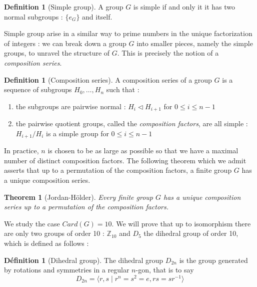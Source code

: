 \documentclass{article}
\theoremstyle{definition}
\newtheorem{definition}[subsubsection]{Définition}
\theoremstyle{plain}
\theoremstyle{plain}
\theoremstyle{plain}
\theoremstyle{plain}
\theoremstyle{definition}
\newtheorem{defeng}[subsubsection]{Definition}
\theoremstyle{plain}
\newtheorem{thmeng}[subsubsection]{Theorem}
\theoremstyle{plain}
\begin{document}
\begin{defeng}[Simple group]
	A group \( G \) is simple if and only it it has two normal subgroups : 
	\( \{e_G\} \) and itself.
\end{defeng}

\par Simple group arise in a similar way to prime numbers in the unique factorization of integers : we can break down a group \( G \) into smaller pieces, namely the simple groups, to unravel the structure of \( G \).
This is precisely the notion of a \textit{composition series}.

\begin{defeng}[Composition series]
	A composition series of a group \( G \) is a sequence of subgroups \( H_0, \ldots, H_n \) such that :
	\begin{enumerate}[label = (\roman*)]
	\item the subgroups are pairwise normal : 
		\( H_i \triangleleft H_{i+1} \) for \( 0 \leq i \leq n-1 \)
	\item the pairwise quotient groups, called the \textit{composition factors}, are all simple :
		\( H_{i+1}/H_{i} \) is a simple group for \( 0 \leq i \leq n-1 \)

	\end{enumerate}
\par In practice, \( n \) is chosen to be as large as possible so that we have
a maximal number of distinct composition factors. The following theorem which we admit asserts that up to a permutation of the composition factors, a finite group \( G \) has a unique composition series.

\begin{thmeng}[Jordan-Hölder]
	Every finite group \( G \) has a unique composition series up to a permutation of the composition factors.	
\end{thmeng}
\end{defeng}

\par We study the case \( Card(G) = 10 \). We will prove that up to isomorphism there are only two groups of order 10 : \( \mathbb{Z}_{10} \) and \( D_5 \) the dihedral group of order 10, which is defined as follows :

\begin{definition}[Dihedral group]
	The dihedral group \( D_{2n} \) is the group generated by rotations and symmetries in a regular \(n\)-gon, that is to say 
	\begin{equation*}
		D_{2n} = \langle r,s \mid r^{n} = s^{2} = e, rs = sr^{-1} \rangle 
	\end{equation*}
\end{definition}
\end{document}
